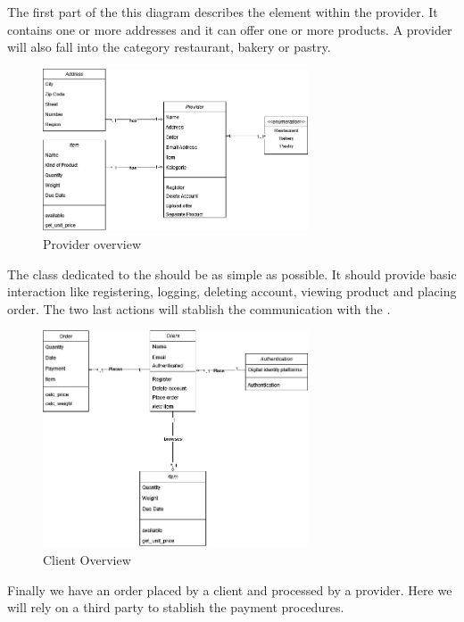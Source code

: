 The first part of the this diagram describes the element within the \gls{provider}. It contains one or more addresses and it 
can offer one or more products. A provider will also fall into the category restaurant, bakery or pastry.

\begin{figure}[H]
    \centering
    \includegraphics[width=0.7\textwidth]{assets/Provider_Addr_Item.jpg}
    \caption{Provider overview}
    \label{fig:Provider_addr_item}
\end{figure}
 
The class dedicated to the  should be as simple as possible. It should provide basic interaction like
registering, logging, deleting account, viewing product and placing order. The two last actions will stablish the communication 
with the .

\begin{figure}[H]
    \centering
    \includegraphics[width=0.7\textwidth]{assets/client_CD.jpg}
    \caption{Client Overview}
    \label{fig:client_CD}
\end{figure}

Finally we have an order placed by a \gls{client} and processed by a \gls{provider}. Here we will rely on a third party 
to stablish the payment procedures.


